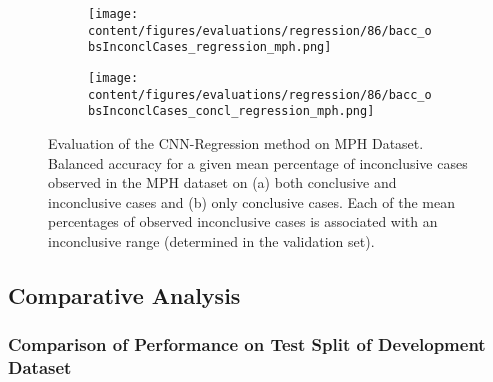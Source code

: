 \begin{figure}[t]
\begin{subfigure}{0.9\textwidth}
  \centering
  \texttt{[image: content/figures/evaluations/regression/86/bacc\_obsInconclCases\_regression\_mph.png]}
  \subcaption{}
  \label{fig:bacc_obsInconclCases_regression_mph}
\end{subfigure}
\hfill
\begin{subfigure}{0.9\textwidth}
  \centering
  \texttt{[image: content/figures/evaluations/regression/86/bacc\_obsInconclCases\_concl\_regression\_mph.png]}
  \subcaption{}
  \label{fig:bacc_obsInconclCases_concl_regression_mph}
\end{subfigure}

\caption{Evaluation of the CNN-Regression method on MPH Dataset.
Balanced accuracy for a given mean percentage of inconclusive cases observed in the MPH dataset on 
(a) both conclusive and inconclusive cases and (b) only conclusive cases. 
Each of the mean percentages of observed inconclusive cases is associated 
with an inconclusive range (determined in the validation set). }
\label{fig:bacc_obsInconclCases_regression_mph_full}
\end{figure}


\subsection{Comparative Analysis}
\label{subsec:compar_anal}


\subsubsection{Comparison of Performance on Test Split of Development Dataset}
\label{subsubsec:perf_comp_dev}



